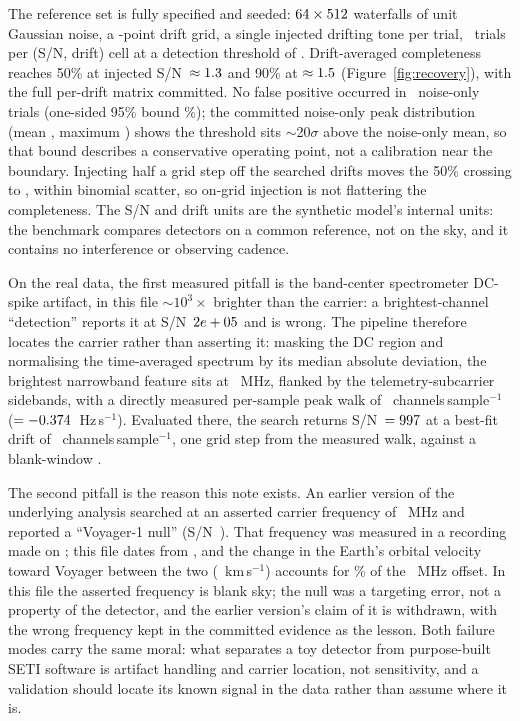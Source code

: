 \documentclass[RNAAS]{aastex631}
\begin{document}
The reference set is fully specified and seeded: $64\times512$ waterfalls of unit
Gaussian noise, a \dsNsearchDrifts-point drift grid, a single injected drifting tone per
trial, \dsNtrials\ trials per (S/N, drift) cell at a detection threshold of \dsThreshold.
Drift-averaged completeness reaches 50\% at injected S/N~$\approx1.3$ and 90\% at
$\approx1.5$ (Figure~\ref{fig:recovery}), with the full per-drift matrix committed. No
false positive occurred in \dsFprTrials\ noise-only trials (one-sided 95\% bound
\dsFprBound\%); the committed noise-only peak distribution (mean \dsNoiseMean, maximum
\dsNoiseMax) shows the threshold sits $\sim$20$\sigma$ above the noise-only mean, so that
bound describes a conservative operating point, not a calibration near the boundary.
Injecting half a grid step off the searched drifts moves the 50\% crossing to
\dsOffGridCfifty, within binomial scatter, so on-grid injection is not flattering the
completeness. The S/N and drift units are the synthetic model's internal units: the benchmark
compares detectors on a common reference, not on the sky, and it contains no interference or
observing cadence.

On the real data, the first measured pitfall is the band-center spectrometer DC-spike
artifact, in this file $\sim10^{3}\times$ brighter than the carrier: a brightest-channel
``detection'' reports it at S/N~$2e+05$ and is wrong. The pipeline therefore locates
the carrier rather than asserting it: masking the DC region and normalising the time-averaged
spectrum by its median absolute deviation, the brightest narrowband feature sits at
\dsVoyFreq~MHz, flanked by the telemetry-subcarrier sidebands, with a directly measured
per-sample peak walk of \dsVoyDriftChan\ channels\,sample$^{-1}$
($=-0.374$~Hz\,s$^{-1}$). Evaluated there, the search returns S/N~$=997$ at a
best-fit drift of \dsVoyBestDrift\ channels\,sample$^{-1}$, one grid step from the measured
walk, against a blank-window \dsVoyBlankSnr.

The second pitfall is the reason this note exists. An earlier version of the underlying
analysis searched at an asserted carrier frequency of \dsVoyLegacyFreq~MHz
\citep{estevez2021} and reported a ``Voyager-1 null'' (S/N~\dsVoyLegacySnr). That frequency
was measured in a recording made on \dsVoyLegacyDate; this file dates from \dsVoyFileDate, and
the change in the Earth's orbital velocity toward Voyager between the two
(\dsVoyDopplerDv~km\,s$^{-1}$) accounts for \dsVoyDopplerPct\% of the \dsVoyOffset~MHz offset.
In this file the asserted frequency is blank sky; the null was a targeting error, not a property of the detector, and the earlier
version's claim of it is withdrawn, with the wrong frequency kept in the committed evidence as
the lesson. Both failure modes
carry the same moral: what separates a toy detector from purpose-built SETI software
\citep{enriquez2017} is artifact handling and carrier location, not sensitivity, and a
validation should locate its known signal in the data rather than assume where it is.
\end{document}

